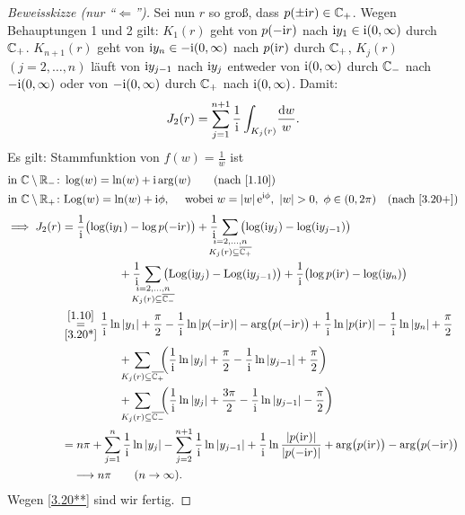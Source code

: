 \documentclass[a4paper,twoside,DIV15,BCOR12mm]{scrbook}
\begin{document}
\begin{proof}[Beweisskizze (nur "`$\Leftarrow$"')]
Sei nun $r$ so groß, dass $p(\pm\mathrm{i} r)\in\mathbb{C}_+$. Wegen Behauptungen 1 und 2 gilt: $K_1(r)$ geht von $p(-\mathrm{i} r)$ nach $\mathrm{i} y_1\in\mathrm{i}(0,\infty)$ durch $\mathbb{C}_+$. $K_{n+1}(r)$ geht von $\mathrm{i} y_n\in-\mathrm{i}(0,\infty)$ nach $p(\mathrm{i} r)$ durch $\mathbb{C}_+$, $K_j(r)$ $(j=2,\dotsc,n)$ läuft von $\mathrm{i} y_{j-1}$ nach $\mathrm{i} y_j$ entweder von $\mathrm{i} (0,\infty)$ durch $\mathbb{C}_-$ nach $-\mathrm{i}(0,\infty)$ oder von $-\mathrm{i}(0,\infty)$ durch $\mathbb{C}_+$ nach $\mathrm{i}(0,\infty)$. Damit:
\[J_2(r) = \sum_{j=1}^{n+1}\frac{1}{\mathrm{i}}\int_{K_j(r)}\!\frac{\mathrm{d} w}{w}.\]
Es gilt: Stammfunktion von $f(w) = \frac{1}{w}$ ist
\begin{align*}
\text{in }\C\setminus\R_-\colon&\log(w) = \ln(w)+\i\arg(w)\qquad\text{(nach~\eqref{1.10})}\\
\text{in }\C\setminus\R_+\colon&\Log(w) = \ln(w)+\i\phi,\quad\text{ wobei }w = \abs{w}\e^{\i\phi},\ \abs{w}>0,\ \phi\in(0,2\pi)\quad\text{(nach \eqref{3.20+})}
\end{align*}
\begin{align*}
\folgt J_2(r) &= \frac{1}{\i}\bigl(\log(\i y_1)-\log p(-\i r)\bigr) + \frac{1}{\i}\!\!\!\!\!\!\sum_{\substack{i=2,\dotsc,n\\K_j(r)\subseteq\abg{\C_+}}}\!\!\!\!\!\!\bigl(\log(\i y_j)-\log(\i y_{j-1})\bigr)\\&\quad\qquad\qquad + \frac{1}{\i}\!\!\!\!\!\!\sum_{\substack{i=2,\dotsc,n\\K_j(r)\subseteq\abg{\C_-}}}\!\!\!\!\!\!\bigl(\Log(\i y_j)-\Log(\i y_{j-1})\bigr) + \frac{1}{\i}\bigl(\log p(\i r)-\log(\i y_{n})\bigr)\\
&\overset{\eqref{1.10}}{\underset{\eqref{3.20*}}{=}} \frac{1}{\i}\ln\abs{y_1}+\frac{\pi}{2} - \frac{1}{\i}\ln\abs{p(-\i r)} - \arg\bigl(p(-\i r)\bigr) + \frac{1}{\i}\ln\abs{p(\i r)}  - \frac{1}{\i}\ln\abs{y_n}+\frac{\pi}{2}\\
&\quad\qquad\qquad+\!\!\!\!\!\!\sum_{K_j(r)\subseteq\abg{\C_+}}\!\!\!\left(\frac{1}{\i}\ln\abs{y_j} + \frac{\pi}{2} - \frac{1}{\i}\ln\abs{y_{j-1}}+ \frac{\pi}{2}\right)\\
&\quad\qquad\qquad+\!\!\!\!\!\!\sum_{K_j(r)\subseteq\abg{\C_-}}\!\!\!\left(\frac{1}{\i}\ln\abs{y_j} + \frac{3\pi}{2} - \frac{1}{\i}\ln\abs{y_{j-1}}- \frac{\pi}{2}\right)\\
&=n\pi + \sum_{j=1}^n\frac{1}{\i}\ln\abs{y_j} - \sum_{j=2}^{n+1}\frac{1}{\i}\ln\abs{y_{j-1}} + \frac{1}{\i}\ln\frac{\abs{p(\i r)}}{\abs{p(-\i r)}} + \arg\bigl(p(\i r)\bigr) - \arg\bigl(p(-\i r)\bigr)\\
&\quad \lra n\pi\qquad(n\to\infty).
\end{align*}
Wegen \eqref{3.20**} sind wir fertig.


\end{proof}
\end{document}
